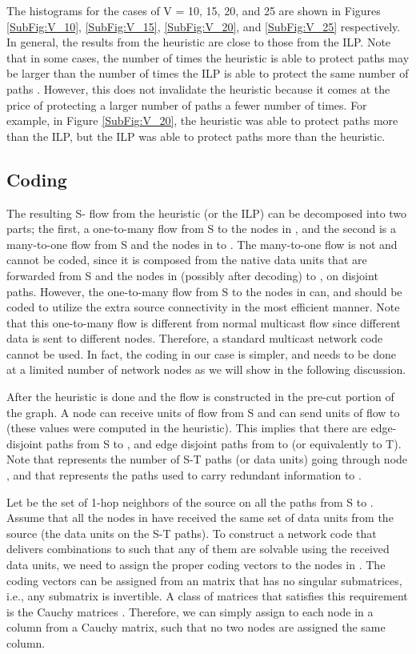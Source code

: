 \documentclass[conference]{IEEEtran}
\begin{document}
The histograms for the cases of V = 10, 15, 20, and 25 are shown in Figures \ref{SubFig:V_10}, \ref{SubFig:V_15}, \ref{SubFig:V_20}, and \ref{SubFig:V_25} respectively. In general, the results from the heuristic are close to those from the ILP. Note that in some cases, the number of times the heuristic is able to protect  paths may be larger than the number of times the ILP is able to protect the same number of paths . However, this does not invalidate the heuristic because it comes at the price of protecting a larger number of paths  a fewer number of times. For example, in Figure \ref{SubFig:V_20}, the heuristic was able to protect  paths more than the ILP, but the ILP was able to protect  paths more than the heuristic. 


\subsection{Coding}

The resulting S- flow from the heuristic (or the ILP) can be decomposed into two parts; the first, a one-to-many flow from S to the nodes in , and the second is a many-to-one flow from S and the nodes in  to . The many-to-one flow is not and cannot be coded, since it is composed from the  native data units that are forwarded from S and the nodes in  (possibly after decoding) to , on  disjoint paths. However, the one-to-many flow from S to the nodes in  can, and should be coded to utilize the extra source connectivity in the most efficient manner. Note that this one-to-many flow is different from normal multicast flow since different data is sent to different nodes. Therefore, a standard multicast network code cannot be used. In fact, the coding in our case is simpler, and needs to be done at a limited number of network nodes as we will show in the following discussion. 

After the heuristic is done and the flow is constructed in the pre-cut portion of the graph. A node  can receive  units of flow from S and can send  units of flow to  (these values were computed in the heuristic). This implies that there are  edge-disjoint paths from S to , and  edge disjoint paths from  to  (or equivalently to T). Note that  represents the number of S-T paths (or data units) going through node , and that  represents the paths used to carry redundant information to .



Let  be the set of 1-hop neighbors of the source on all the  paths from S to . Assume that all the nodes in  have received the same set of  data units from the source (the  data units on the  S-T paths). To construct a network code that delivers  combinations to  such that any  of them are solvable using the received data units, we need to assign the proper coding vectors to the nodes in . The coding vectors can be assigned from an  matrix that has no singular  submatrices, i.e., any  submatrix is invertible. A class of matrices that satisfies this requirement is the Cauchy matrices \cite{FN77}. Therefore, we can simply assign to each node in  a column from a  Cauchy matrix, such that no two nodes are assigned the same column. 
\end{document}
